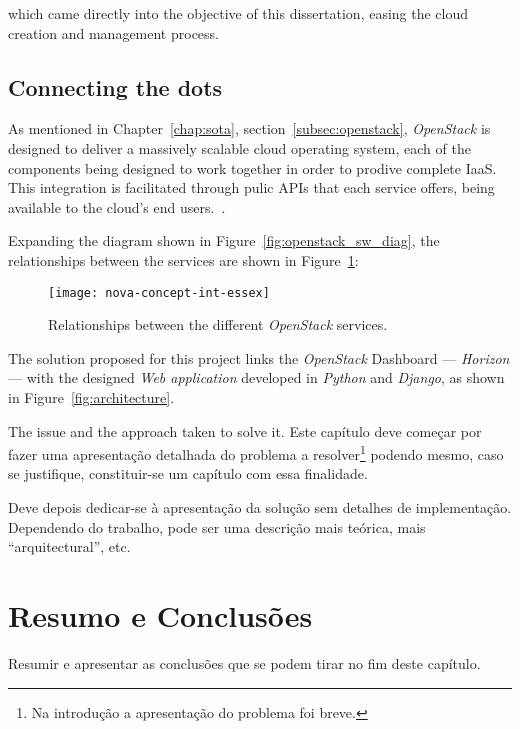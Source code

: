 which came directly into the objective of this dissertation, easing the cloud creation and management process.

\subsection{Connecting the dots}\label{subsec:architecture}

As mentioned in Chapter~\ref{chap:sota}, section~\ref{subsec:openstack}, \textit{OpenStack} is designed to deliver a massively scalable cloud operating system, each of the components being designed to work together in order to prodive complete IaaS. This integration is facilitated through pulic APIs that each service offers, being available to the cloud's end users.~\cite{http://ken.pepple.info/openstack/2012/02/21/revisit-openstack-architecture-diablo/}. 

Expanding the diagram shown in Figure~\ref{fig:openstack_sw_diag}, the relationships between the services are shown in Figure~\ref{fig:openstack_services}:

\begin{figure}[t!]
  \begin{center}
    \leavevmode
    \texttt{[image: nova-concept-int-essex]}
    \caption{Relationships between the different \textit{OpenStack} services\cite{http://ken.pepple.info/openstack/2012/02/21/revisit-openstack-architecture-diablo/}.}
    \label{fig:openstack_services}
  \end{center}
\end{figure}

The solution proposed for this project links the \textit{OpenStack} Dashboard --- \textit{Horizon} --- with the designed \textit{Web application} developed in \textit{Python} and \textit{Django}, as shown in Figure~\ref{fig:architecture}.







The issue and the approach taken to solve it.
Este capítulo deve começar por fazer uma apresentação detalhada do
problema a resolver\footnote{Na introdução a apresentação do
  problema foi breve.} podendo mesmo, caso se justifique,
constituir-se um capítulo com essa finalidade.

Deve depois dedicar-se à apresentação da solução sem detalhes de
implementação. 
Dependendo do trabalho, pode ser uma descrição mais teórica, mais
``arquitectural'', etc.
\clearpage
\section{Resumo e Conclusões}

Resumir e apresentar as conclusões que se podem tirar no fim deste
capítulo.
